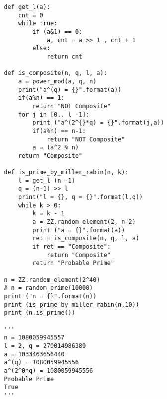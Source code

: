 \documentclass[12pt,openany]{book}
\theoremstyle{definition}
\begin{document}
	\begin{lstlisting}[style=sage, caption={Miller-Rabin Primality Test (Sage)},captionpos=t]
def get_l(a):
	cnt = 0
	while true:
		if (a&1) == 0:
			a, cnt = a >> 1 , cnt + 1
		else:
			return cnt

def is_composite(n, q, l, a):
	a = power_mod(a, q, n)
	print("a^(q) = {}".format(a))
	if(a%n) == 1:
		return "NOT Composite"
	for j in [0.. l -1]:
		print ("a^(2^{}*q) = {}".format(j,a))
		if(a%n) == n-1:
			return "NOT Composite"
		a = (a^2 % n)
	return "Composite"

def is_prime_by_miller_rabin(n, k):
	l = get_l (n -1)
	q = (n-1) >> l
	print("l = {}, q = {}".format(l,q))
	while k > 0:
		k = k - 1
		a = ZZ.random_element(2, n-2)
		print ("a = {}".format(a))
		ret = is_composite(n, q, l, a)
		if ret == "Composite":		
			return "Composite"
		return "Probable Prime"

n = ZZ.random_element(2^40)
# n = random_prime(10000)
print ("n = {}".format(n))
print (is_prime_by_miller_rabin(n,10))
print (n.is_prime())

'''
n = 1080059945557
l = 2, q = 270014986389
a = 1033463656440
a^(q) = 1080059945556
a^(2^0*q) = 1080059945556
Probable Prime
True
'''
	\end{lstlisting}
\newpage
\end{document}
